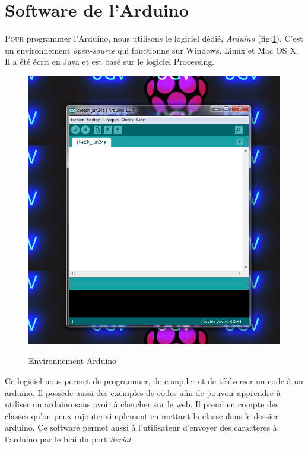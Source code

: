 \documentclass[a4paper,12pt]{report}
\begin{document}
{\section{Software de l'Arduino}
\lettrine{P}{our} programmer l'Arduino, nous utilisons le logiciel dédié, \textit{Arduino} (fig:\ref{Environnement Arduino}), C'est un environnement \textit{open-source} qui fonctionne sur Windows, Linux et Mac OS X. Il a été écrit en Java et est basé sur le logiciel Processing.
\begin{figure}[h!]
\begin{center}
\includegraphics[scale=0.5]{arduino-environnement-1}\\
\caption{Environnement Arduino\label{Environnement Arduino}}
\end{center}
\end{figure}
Ce logiciel nous permet de programmer, de compiler et de téléverser un code à un arduino. Il possède aussi des exemples de codes afin de pouvoir apprendre à utiliser un arduino sans avoir à chercher sur le web. Il prend en compte des classes qu'on peux rajouter simplement en mettant la classe dans le dossier arduino. Ce software permet aussi à l'utilisateur d'envoyer des caractères à l'arduino par le biai du port \textit{Serial}. 



}
\end{document}
